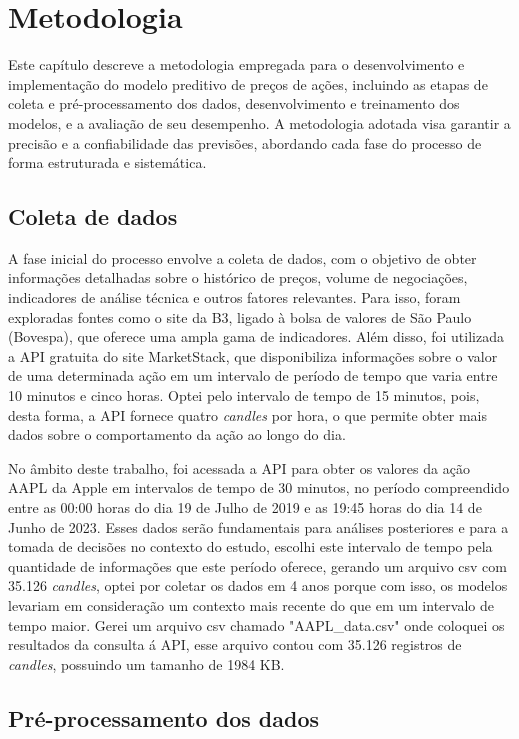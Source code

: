 \chapter{Metodologia}

Este capítulo descreve a metodologia empregada para o desenvolvimento e implementação do modelo preditivo de preços de ações, incluindo as etapas de coleta e pré-processamento dos dados, desenvolvimento e treinamento dos modelos, e a avaliação de seu desempenho. A metodologia adotada visa garantir a precisão e a confiabilidade das previsões, abordando cada fase do processo de forma estruturada e sistemática.

\section{Coleta de dados}

A fase inicial do processo envolve a coleta de dados, com o objetivo de obter informações detalhadas sobre o histórico de preços, volume de negociações, indicadores de análise técnica e outros fatores relevantes. Para isso, foram exploradas fontes como o site da B3, ligado à bolsa de valores de São Paulo (Bovespa), que oferece uma ampla gama de indicadores. Além disso, foi utilizada a API gratuita do site MarketStack, que disponibiliza informações sobre o valor de uma determinada ação em um intervalo de período de tempo que varia entre 10 minutos e cinco horas. Optei pelo intervalo de tempo de 15 minutos, pois, desta forma, a API fornece quatro \textit{candles} por hora, o que permite obter mais dados sobre o comportamento da ação ao longo do dia.

No âmbito deste trabalho, foi acessada a API para obter os valores da ação AAPL da Apple em intervalos de tempo de 30 minutos, no período compreendido entre as 00:00 horas do dia 19 de Julho de 2019 e as 19:45 horas do dia 14 de Junho de 2023. Esses dados serão fundamentais para análises posteriores e para a tomada de decisões no contexto do estudo, escolhi este intervalo de tempo pela quantidade de informações que este período oferece, gerando um arquivo csv com 35.126 \textit{candles}, optei por coletar os dados em 4 anos porque com isso, os modelos levariam em consideração um contexto mais recente do que em um intervalo de tempo maior. Gerei um arquivo csv chamado "AAPL\_data.csv" onde coloquei os resultados da consulta á API, esse arquivo contou com 35.126 registros de \textit{candles}, possuindo um tamanho de 1984 KB.

\section{Pré-processamento dos dados}

